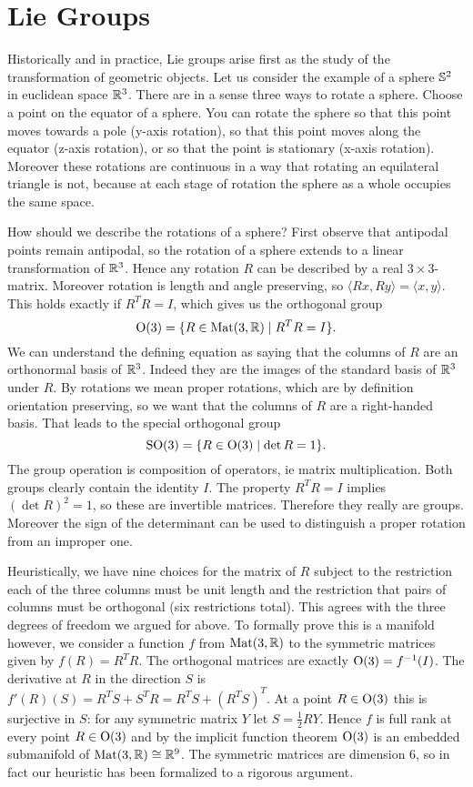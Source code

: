 \chapter{Lie Groups}

Historically and in practice, Lie groups arise first as the study of the transformation of geometric objects.
Let us consider the example of a sphere $\mathbb{S}^2$ in euclidean space $\mathbb{R}^3$.
There are in a sense three ways to rotate a sphere.
Choose a point on the equator of a sphere.
You can rotate the sphere so that this point moves towards a pole (y-axis rotation), so that this point moves along the equator (z-axis rotation), or so that the point is stationary (x-axis rotation).
Moreover these rotations are continuous in a way that rotating an equilateral triangle is not, because at each stage of rotation the sphere as a whole occupies the same space.
 
How should we describe the rotations of a sphere?
First observe that antipodal points remain antipodal, so the rotation of a sphere extends to a linear transformation of $\mathbb{R}^3$.
Hence any rotation $R$ can be described by a real $3\times 3$-matrix.
Moreover rotation is length and angle preserving, so $\langle Rx, Ry \rangle = \langle x, y \rangle$.
This holds exactly if $R^TR = I$, which gives us the orthogonal group
\[
\mathrm{O}(3) = \{ R \in \operatorname{Mat}(3,\mathbb{R}) \mid R^TR = I \}.
\]
We can understand the defining equation as saying that the columns of $R$ are an orthonormal basis of $\mathbb{R}^3$.
Indeed they are the images of the standard basis of $\mathbb{R}^3$ under $R$.
By rotations we mean proper rotations, which are by definition orientation preserving, so we want that the columns of $R$ are a right-handed basis.
That leads to the special orthogonal group
\[
\mathrm{SO}(3) = \{ R \in \mathrm{O}(3) \mid \det R = 1 \}.
\]
The group operation is composition of operators, ie matrix multiplication.
Both groups clearly contain the identity $I$.
The property $R^T R = I$ implies $(\det R)^2 = 1$, so these are invertible matrices.
Therefore they really are groups.
Moreover the sign of the determinant can be used to distinguish a proper rotation from an improper one.

Heuristically, we have nine choices for the matrix of $R$ subject to the restriction each of the three columns must be unit length and the restriction that pairs of columns must be orthogonal (six restrictions total).
This agrees with the three degrees of freedom we argued for above.
To formally prove this is a manifold however, we consider a function $f$ from $\operatorname{Mat}(3,\mathbb{R})$ to the symmetric matrices given by $f(R) = R^TR$.
The orthogonal matrices are exactly $\mathrm{O}(3) = f^{-1}(I)$.
The derivative at $R$ in the direction $S$ is $f'(R)(S) = R^TS + S^T R = R^T S + (R^T S)^T$.
At a point $R \in \mathrm{O}(3)$ this is surjective in $S$: for any symmetric matrix $Y$ let $S = \frac{1}{2}RY$.
Hence $f$ is full rank at every point $R \in \mathrm{O}(3)$ and by the implicit function theorem $\mathrm{O}(3)$ is an embedded submanifold of $\operatorname{Mat}(3,\mathbb{R}) \cong \mathbb{R}^9$.
The symmetric matrices are dimension $6$, so in fact our heuristic has been formalized to a rigorous argument.

